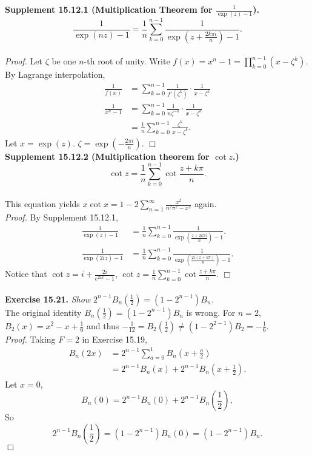 \documentclass{article}
\begin{document}
\textbf{Supplement 15.12.1 (Multiplication Theorem for $\frac{1}{\exp(z) - 1}$).}
\emph{$$\frac{1}{\exp(nz) - 1}
= \frac{1}{n} \sum_{k=0}^{n-1} \frac{1}{\exp(z + \frac{2 k \pi i}{n}) - 1}.$$} \\
\emph{Proof.}
Let $\zeta$ be one $n$-th root of unity.
Write $f(x) = x^n - 1 = \prod_{k=0}^{n-1}(x - \zeta^k)$.
By Lagrange interpolation,
\begin{align*}
\frac{1}{f(x)}
&=
\sum_{k=0}^{n-1} \frac{1}{f'(\zeta^k)} \cdot \frac{1}{x - \zeta^k} \\
\frac{1}{x^n - 1}
&= \sum_{k=0}^{n-1} \frac{1}{n \zeta^{-k}} \cdot \frac{1}{x - \zeta^k} \\
&= \frac{1}{n} \sum_{k=0}^{n-1} \frac{\zeta^k}{x - \zeta^k}.
\end{align*}
Let $x = \exp(z)$. $\zeta = \exp(-\frac{2 \pi i}{n})$.
$\Box$ \\

\textbf{Supplement 15.12.2 (Multiplication theorem for $\cot z$.)}
\emph{$$\cot z = \frac{1}{n} \sum_{k=0}^{n-1} \cot\frac{z + k\pi}{n}.$$} \\

This equation yields
$x \cot x = 1 - 2 \sum_{n=1}^{\infty} \frac{x^2}{n^2 \pi^2 - x^2}$ again. \\

\emph{Proof.}
By Supplement 15.12.1,
\begin{align*}
\frac{1}{\exp(z) - 1}
&=
\frac{1}{n} \sum_{k=0}^{n-1} \frac{1}{\exp(\frac{z + 2 k \pi i}{n}) - 1}. \\
\frac{1}{\exp(2iz) - 1}
&=
\frac{1}{n} \sum_{k=0}^{n-1} \frac{1}{\exp(\frac{2i (z + k \pi)}{n}) - 1}.
\end{align*}
Notice that $\cot z = i + \frac{2i}{e^{2ix} - 1}$,
$\cot z = \frac{1}{n} \sum_{k=0}^{n-1} \cot\frac{z + k\pi}{n}$.
$\Box$ \\\\



\textbf{Exercise 15.21.}
\emph{Show $2^{n-1} B_n(\frac{1}{2}) = (1 - 2^{n-1})B_n$.} \\

The original identity $B_n(\frac{1}{2}) = (1 - 2^{n-1})B_n$ is wrong.
For $n = 2$, $B_2(x) = x^2 - x + \frac{1}{6}$ and thus
$-\frac{1}{12} = B_2(\frac{1}{2}) \neq (1 - 2^{2-1})B_2 = -\frac{1}{6}$. \\

\emph{Proof.}
Taking $F = 2$ in Exercise 15.19,
\begin{align*}
B_n(2x)
&= 2^{n-1} \sum_{a = 0}^{1} B_n\left( x + \frac{a}{2} \right) \\
&= 2^{n-1} B_n(x) + 2^{n-1} B_n\left( x + \frac{1}{2} \right).
\end{align*}
Let $x = 0$,
$$B_n(0) = 2^{n-1} B_n(0) + 2^{n-1} B_n\left( \frac{1}{2} \right), $$
So
$$2^{n-1} B_n\left( \frac{1}{2} \right)
= (1 - 2^{n-1}) B_n(0)
= (1 - 2^{n-1}) B_n.$$
$\Box$ \\\\
\end{document}
